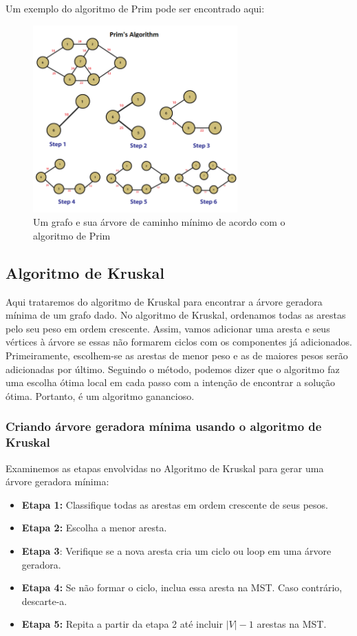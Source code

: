 \documentclass{article}
\begin{document}
Um exemplo do algoritmo de Prim pode ser encontrado aqui:
\begin{figure}
\centering
\includegraphics[width = 0.7\textwidth]{kauan_imagens/prims-algorithm-java.png}
\caption{Um grafo e sua árvore de caminho mínimo de acordo com o algoritmo de Prim}
\label{fig:enter-label}
\end{figure}


\subsection{Algoritmo de Kruskal}

Aqui trataremos do algoritmo de Kruskal para encontrar a árvore geradora mínima de um grafo dado.
No algoritmo de Kruskal, ordenamos todas as arestas pelo seu peso em ordem crescente. Assim, vamos adicionar uma aresta e seus vértices à árvore se essas não formarem ciclos com os componentes já adicionados. Primeiramente, escolhem-se as arestas de menor peso e as de maiores pesos serão adicionadas por último. Seguindo o método, podemos dizer que o algoritmo faz uma escolha ótima local em cada passo com a intenção de encontrar a solução ótima. Portanto, é um algoritmo ganancioso. 


\subsubsection{Criando árvore geradora mínima usando o algoritmo de Kruskal}

Examinemos as etapas envolvidas no Algoritmo de Kruskal para gerar uma árvore geradora mínima:

\begin{itemize}
    \item \textbf{Etapa 1:} Classifique todas as arestas em ordem crescente de seus pesos.
    \item \textbf{Etapa 2:} Escolha a menor aresta.
    \item \textbf{Etapa 3}: Verifique se a nova aresta cria um ciclo ou loop em uma árvore geradora.
    \item \textbf{Etapa 4:} Se não formar o ciclo, inclua essa aresta na MST. Caso contrário, descarte-a.
    \item \textbf{Etapa 5:} Repita a partir da etapa 2 até incluir $|V| - 1$ arestas na MST.
\end{itemize}
\end{document}
